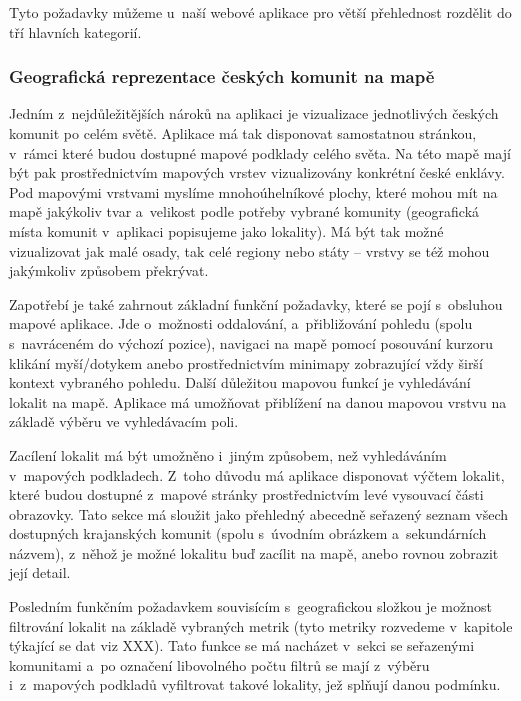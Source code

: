 Tyto požadavky můžeme u~naší webové aplikace pro větší přehlednost rozdělit do tří hlavních kategorií.

\hypertarget{geografickuxe1-reprezentace-ux10deskuxfdch-komunit-na-mapux11b}{%
\subsubsection{Geografická reprezentace českých komunit na mapě}\label{geografickuxe1-reprezentace-ux10deskuxfdch-komunit-na-mapux11b}}

Jedním z~nejdůležitějších nároků na aplikaci je vizualizace jednotlivých českých komunit po celém světě. Aplikace má tak disponovat samostatnou stránkou, v~rámci které budou dostupné mapové podklady celého světa. Na této mapě mají být pak prostřednictvím mapových vrstev vizualizovány konkrétní české enklávy. Pod mapovými vrstvami myslíme mnohoúhelníkové plochy, které mohou mít na mapě jakýkoliv tvar a~velikost podle potřeby vybrané komunity (geografická místa komunit v~aplikaci popisujeme jako lokality). Má být tak možné vizualizovat jak malé osady, tak celé regiony nebo státy -- vrstvy se též mohou jakýmkoliv způsobem překrývat.

Zapotřebí je také zahrnout základní funkční požadavky, které se pojí s~obsluhou mapové aplikace. Jde o~možnosti oddalování, a~přibližování pohledu (spolu s~navráceném do výchozí pozice), navigaci na mapě pomocí posouvání kurzoru klikání myší/dotykem anebo prostřednictvím minimapy zobrazující vždy širší kontext vybraného pohledu. Další důležitou mapovou funkcí je vyhledávání lokalit na mapě. Aplikace má umožňovat přiblížení na danou mapovou vrstvu na základě výběru ve vyhledávacím poli.

Zacílení lokalit má být umožněno i~jiným způsobem, než vyhledáváním v~mapových podkladech. Z~toho důvodu má aplikace disponovat výčtem lokalit, které budou dostupné z~mapové stránky prostřednictvím levé vysouvací části obrazovky. Tato sekce má sloužit jako přehledný abecedně seřazený seznam všech dostupných krajanských komunit (spolu s~úvodním obrázkem a~sekundárních názvem), z~něhož je možné lokalitu buď zacílit na mapě, anebo rovnou zobrazit její detail.

Posledním funkčním požadavkem souvisícím s~geografickou složkou je možnost filtrování lokalit na základě vybraných metrik (tyto metriky rozvedeme v~kapitole týkající se dat viz XXX). Tato funkce se má nacházet v~sekci se seřazenými komunitami a~po označení libovolného počtu filtrů se mají z~výběru i~z~mapových podkladů vyfiltrovat takové lokality, jež splňují danou podmínku.

